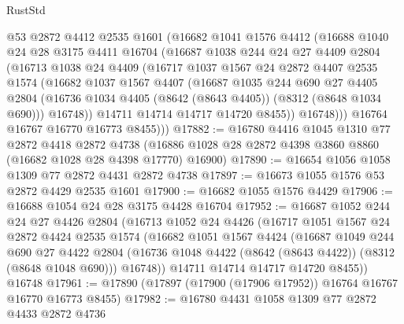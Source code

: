 \begin{lexlean}{RustStd}
\begin{coremodule}
          @53
          @2872
          @4412
          @2535
          @1601
          (@16682
            @1041
            @1576
            @4412
            (@16688
              @1040
              @24
              @28
              @3175
              @4411
              @16704
              (@16687
                @1038
                @244
                @24
                @27
                @4409
                @2804
                (@16713
                  @1038
                  @24
                  @4409
                  (@16717
                    @1037
                    @1567
                    @24
                    @2872
                    @4407
                    @2535
                    @1574
                    (@16682
                      @1037
                      @1567
                      @4407
                      (@16687
                        @1035
                        @244
                        @690
                        @27
                        @4405
                        @2804
                        (@16736 @1034 @4405 (@8642 (@8643 @4405)) (@8312 (@8648 @1034 @690)))
                        @16748))
                    @14711
                    @14714
                    @14717
                    @14720
                    @8455))
                @16748)))
          @16764
          @16767
          @16770
          @16773
          @8455)))
@17882 := @16780
    @4416
    @1045
    @1310
    @77
    @2872
    @4418
    @2872
    @4738
    (@16886 @1028 @28 @2872 @4398 @3860 @8860 (@16682 @1028 @28 @4398 @17770) @16900)
@17890 := @16654 @1056 @1058 @1309 @77 @2872 @4431 @2872 @4738
@17897 := @16673 @1055 @1576 @53 @2872 @4429 @2535 @1601
@17900 := @16682 @1055 @1576 @4429
@17906 := @16688 @1054 @24 @28 @3175 @4428 @16704
@17952 := @16687
    @1052
    @244
    @24
    @27
    @4426
    @2804
    (@16713
      @1052
      @24
      @4426
      (@16717
        @1051
        @1567
        @24
        @2872
        @4424
        @2535
        @1574
        (@16682
          @1051
          @1567
          @4424
          (@16687
            @1049
            @244
            @690
            @27
            @4422
            @2804
            (@16736 @1048 @4422 (@8642 (@8643 @4422)) (@8312 (@8648 @1048 @690)))
            @16748))
        @14711
        @14714
        @14717
        @14720
        @8455))
    @16748
@17961 := @17890 (@17897 (@17900 (@17906 @17952)) @16764 @16767 @16770 @16773 @8455)
@17982 := @16780
    @4431
    @1058
    @1309
    @77
    @2872
    @4433
    @2872
    @4736

\end{coremodule}
\end{lexlean}
